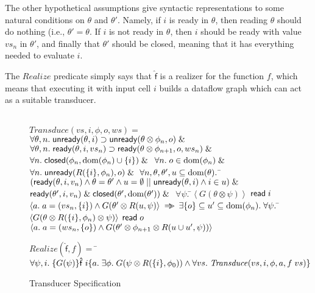 The other hypothetical assumptions give syntactic representations to
some natural conditions on $\theta$ and $\theta'$. Namely, if $i$ is
ready in $\theta$, then reading $\theta$ should do nothing (i.e.,
$\theta' = \theta$. If $i$ is not ready in $\theta$, then $i$ should
be ready with value $vs_n$ in $\theta'$, and finally that $\theta'$
should be closed, meaning that it has everything needed to evaluate
$i$. 

The $\mathit{Realize}$ predicate simply says that $\mathsf{\hat{f}}$
is a realizer for the function $f$, which means that executing it 
with input cell $i$ builds a dataflow graph which can act as a 
suitable transducer.  


\begin{figure}
\begin{specification}
\\ $\mathit{Transduce}(vs, i, \phi, o, ws)  =  $
\nextline $\forall \theta, n.\; \mathsf{unready}({\theta}, {i}) \supset \mathsf{unready}({\theta \otimes \phi_n}, {o}) \;\&\;$ 
\nextline $\forall \theta, n.\; \mathsf{ready}({\theta}, {i}, {vs_n}) \supset \mathsf{ready}({\theta \otimes \phi_{n+1}}, {o}, {ws_n}) \;\&\;$
\nextline $\forall n.\; \mathsf{closed}({\phi_n}, {\mbox{dom}({\phi_n}) \cup \{{i}\}}) \;\&\;$ 
\nextline $\forall n.\; o \in \mbox{dom}({\phi_n}) \;\&\;$
\nextline $\forall n.\; \mathsf{unready}({R(\{{i}\}, \phi_n)}, {o}) \;\&\;$
\nextline\;\; $\forall n, \theta, \theta', u \subseteq \mbox{dom}({\theta}).$  
\nextline\qquad\=$(\mathsf{ready}({\theta}, {i}, {v_n}) \land \theta = \theta' \land u = \emptyset \;||\;
                         \mathsf{unready}({\theta}, {i}) \land i \in u) \;\&\;$ 
\nextline\> $\mathsf{ready}({\theta'}, {i}, {v_n}) \;\&\; \mathsf{closed}({\theta'}, {\mbox{dom}({\theta'})}) \;\&\;$
\nextline\> $\forall \psi.\;$\=$\left<G(\theta \otimes \psi)\right>$ 
\nextline\>\> $\mathsf{read}\; i$
\nextline\>\> $\left<a.\;a = (vs_n, \{{i}\}) \land G(\theta' \otimes R(u,\psi)\right>$ 
\nextline\> $\Rightarrow\!\!\!>$ 
\nextline\> $\exists \{{o}\} \subseteq u' \subseteq \mbox{dom}({\phi_n}).\;  \forall \psi.\;$\=$\left<G(\theta \otimes R(\{{i}\}, \phi_n) \otimes \psi)\right>$ 
\nextline\>\>$\mathsf{read}\; o$ 
\nextline\>\>$\left<a.\;a = (ws_n, \{{o}\}) \land 
                        G(\theta' \otimes \phi_{n+1} \otimes R(u \cup u', \psi))\right>$ 
\end{specification}


\begin{specification}
\nextline $\mathit{Realize}(\mathsf{\hat{f}}, f) = $ 
\nextline\;\;\= $\forall \psi, i.\; \{{G(\psi)}\}{\mathsf{\hat{f}}\;i}\{{a}.\;{\exists \phi.\;G(\psi \otimes R(\{{i}\}, \phi_0)) \land \forall vs.\;\mathit{Transduce}(vs, i, \phi, a, f\;vs)}\}$
\end{specification}
\caption{Transducer Specification}
\label{transducer-specification}
\end{figure}



